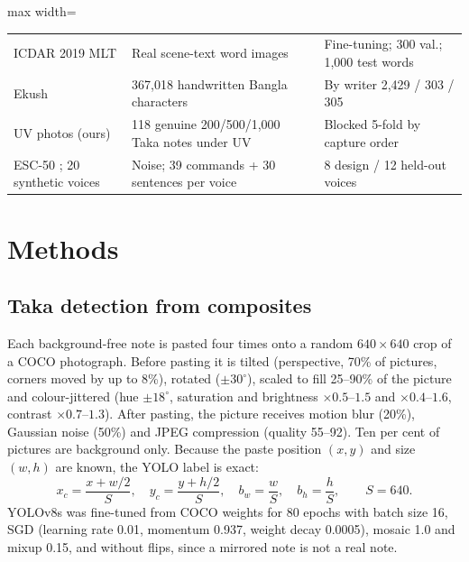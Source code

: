\documentclass[preprint,12pt]{elsarticle}
\begin{document}
\begin{table}[!htbp]
\begin{adjustbox}{max width=\textwidth}
\begin{tabular}{@{}p{3.3cm}p{5.4cm}p{4.9cm}@{}}
ICDAR 2019 MLT \cite{mlt2019} & Real scene-text word images & Fine-tuning; 300 val.; 1,000 test words \\
Ekush \cite{ekush} & 367,018 handwritten Bangla characters & By writer 2,429 / 303 / 305 \\
UV photos (ours) & 118 genuine 200/500/1,000 Taka notes under UV & Blocked 5-fold by capture order \\
ESC-50 \cite{esc50}; 20 synthetic voices & Noise; 39 commands + 30 sentences per voice & 8 design / 12 held-out voices \\ \bottomrule
\end{tabular}\end{adjustbox}
\end{table}

\section{Methods}
\label{sec:methods}

\subsection{Taka detection from composites}
\label{sec:m_comp}
Each background-free note is pasted four times onto a random $640\times640$ crop of a COCO photograph. Before pasting it is tilted (perspective, 70\% of pictures, corners moved by up to 8\%), rotated ($\pm30^\circ$), scaled to fill 25--90\% of the picture and colour-jittered (hue $\pm18^\circ$, saturation and brightness $\times0.5$--$1.5$ and $\times0.4$--$1.6$, contrast $\times0.7$--$1.3$). After pasting, the picture receives motion blur (20\%), Gaussian noise (50\%) and JPEG compression (quality 55--92). Ten per cent of pictures are background only. Because the paste position $(x,y)$ and size $(w,h)$ are known, the YOLO label is exact:
\begin{equation}
x_c=\frac{x+w/2}{S},\quad y_c=\frac{y+h/2}{S},\quad b_w=\frac{w}{S},\quad b_h=\frac{h}{S},\qquad S=640.
\end{equation}
YOLOv8s was fine-tuned from COCO weights for 80 epochs with batch size 16, SGD (learning rate 0.01, momentum 0.937, weight decay 0.0005), mosaic 1.0 and mixup 0.15, and without flips, since a mirrored note is not a real note.
\end{document}
